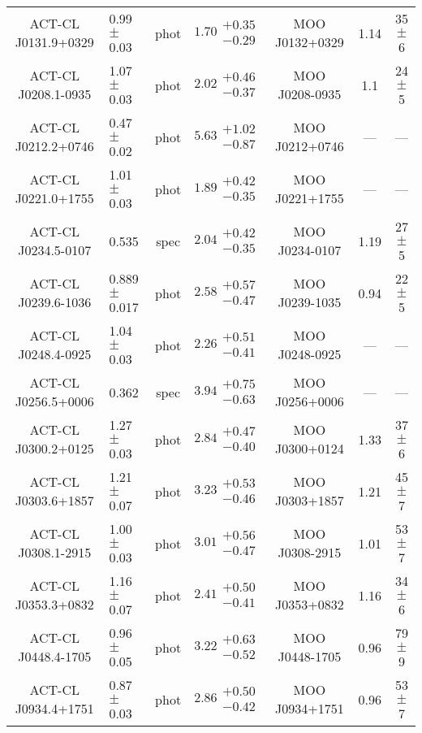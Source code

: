 \begin{longtable}[p!]{clccccc}
ACT-CL J0131.9+0329 & 0.99$\pm$ 0.03 & phot & $1.70\substack{+0.35\\-0.29}$ & MOO J0132+0329 & 1.14 & 35$\pm$ 6 \\
ACT-CL J0208.1-0935 & 1.07$\pm$ 0.03 & phot & $2.02\substack{+0.46\\-0.37}$ & MOO J0208-0935 & 1.1 & 24$\pm$ 5 \\
ACT-CL J0212.2+0746 & 0.47$\pm$ 0.02 & phot & $5.63\substack{+1.02\\-0.87}$ & MOO J0212+0746 & --- & ---\\
ACT-CL J0221.0+1755 & 1.01$\pm$ 0.03 & phot & $1.89\substack{+0.42\\-0.35}$ & MOO J0221+1755 & --- & ---\\
ACT-CL J0234.5-0107 & 0.535& spec & $2.04\substack{+0.42\\-0.35}$ & MOO J0234-0107 & 1.19 & 27$\pm$ 5 \\
ACT-CL J0239.6-1036 & 0.889$\pm$ 0.017 & phot & $2.58\substack{+0.57\\-0.47}$ & MOO J0239-1035 & 0.94 & 22$\pm$ 5 \\
ACT-CL J0248.4-0925 & 1.04$\pm$ 0.03 & phot & $2.26\substack{+0.51\\-0.41}$ & MOO J0248-0925 & --- & ---\\
ACT-CL J0256.5+0006 & 0.362& spec & $3.94\substack{+0.75\\-0.63}$ & MOO J0256+0006 & --- & ---\\
ACT-CL J0300.2+0125 & 1.27$\pm$ 0.03 & phot & $2.84\substack{+0.47\\-0.40}$ & MOO J0300+0124 & 1.33 & 37$\pm$ 6 \\
ACT-CL J0303.6+1857 & 1.21$\pm$ 0.07 & phot & $3.23\substack{+0.53\\-0.46}$ & MOO J0303+1857 & 1.21 & 45$\pm$ 7 \\
ACT-CL J0308.1-2915 & 1.00$\pm$ 0.03 & phot & $3.01\substack{+0.56\\-0.47}$ & MOO J0308-2915 & 1.01 & 53$\pm$ 7 \\
ACT-CL J0353.3+0832 & 1.16$\pm$ 0.07 & phot & $2.41\substack{+0.50\\-0.41}$ & MOO J0353+0832 & 1.16 & 34$\pm$ 6 \\
ACT-CL J0448.4-1705 & 0.96$\pm$ 0.05 & phot & $3.22\substack{+0.63\\-0.52}$ & MOO J0448-1705 & 0.96 & 79$\pm$ 9 \\
ACT-CL J0934.4+1751 & 0.87$\pm$ 0.03 & phot & $2.86\substack{+0.50\\-0.42}$ & MOO J0934+1751 & 0.96 & 53$\pm$ 7 \\

\end{longtable}

